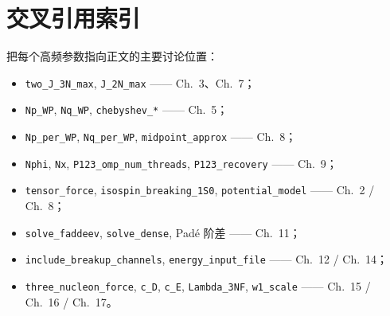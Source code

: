 \section{交叉引用索引}
\label{sec:appE_xref}

把每个高频参数指向正文的主要讨论位置：
\begin{itemize}
  \item \texttt{two\_J\_3N\_max}, \texttt{J\_2N\_max} —— Ch.~3、Ch.~7；
  \item \texttt{Np\_WP}, \texttt{Nq\_WP}, \texttt{chebyshev\_*} —— Ch.~5；
  \item \texttt{Np\_per\_WP}, \texttt{Nq\_per\_WP}, \texttt{midpoint\_approx} —— Ch.~8；
  \item \texttt{Nphi}, \texttt{Nx}, \texttt{P123\_omp\_num\_threads}, \texttt{P123\_recovery} —— Ch.~9；
  \item \texttt{tensor\_force}, \texttt{isospin\_breaking\_1S0}, \texttt{potential\_model} —— Ch.~2 / Ch.~8；
  \item \texttt{solve\_faddeev}, \texttt{solve\_dense}, Padé 阶差 —— Ch.~11；
  \item \texttt{include\_breakup\_channels}, \texttt{energy\_input\_file} —— Ch.~12 / Ch.~14；
  \item \texttt{three\_nucleon\_force}, \texttt{c\_D}, \texttt{c\_E}, \texttt{Lambda\_3NF}, \texttt{w1\_scale} —— Ch.~15 / Ch.~16 / Ch.~17。
\end{itemize}
